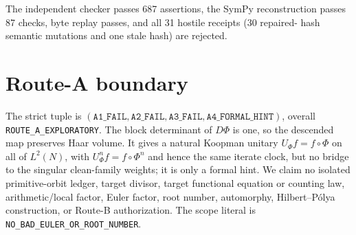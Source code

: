 \documentclass[10pt]{article}
\begin{document}
The independent checker passes 687 assertions, the SymPy reconstruction
passes 87 checks, byte replay passes, and all 31 hostile receipts (30 repaired-
hash semantic mutations and one stale hash) are rejected.

\section{Route-A boundary}
The strict tuple is $(\texttt{A1\_FAIL},\texttt{A2\_FAIL},
\texttt{A3\_FAIL},\texttt{A4\_FORMAL\_HINT})$, overall
\texttt{ROUTE\_A\_EXPLORATORY}.  The block determinant of $D\Phi$ is one, so
the descended map preserves Haar volume.  It gives a natural Koopman unitary
$U_\Phi f=f\circ\Phi$ on all of $L^2(N)$, with
$U_\Phi^n f=f\circ\Phi^n$ and hence the same iterate clock, but no
bridge to the singular clean-family weights; it is only a formal hint.  We
claim no isolated primitive-orbit ledger,
target divisor, target functional equation or counting law, arithmetic/local
factor, Euler factor, root number, automorphy, Hilbert--P\'olya construction,
or Route-B authorization.  The scope literal is
\texttt{NO\_BAD\_EULER\_OR\_ROOT\_NUMBER}.
\end{document}
